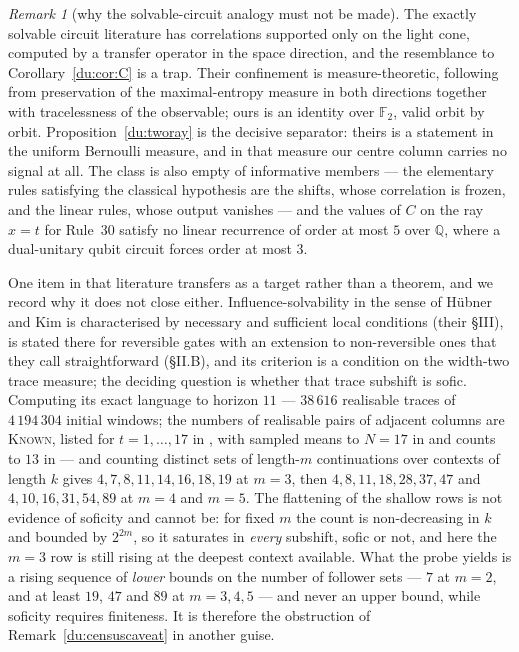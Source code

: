 \documentclass[11pt]{article}
\theoremstyle{definition}
\theoremstyle{remark}
\newtheorem{remark}[theorem]{Remark}
\newcommand{\F}{\mathbb{F}_2}
\newcommand{\Q}{\mathbb{Q}}
\newcommand{\KNOWN}{\textsc{Known}}
\begin{document}
\begin{remark}[why the solvable-circuit analogy must not be made]\label{du:nodual}
The exactly solvable circuit literature has correlations supported only on the light cone, computed by
a transfer operator in the space direction, and the resemblance to Corollary~\ref{du:cor:C} is a trap.
Their confinement is measure-theoretic, following from preservation of the maximal-entropy measure in
both directions together with tracelessness of the observable; ours is an identity over $\F$, valid
orbit by orbit. Proposition~\ref{du:tworay} is the decisive separator: theirs is a statement in the
uniform Bernoulli measure, and in that measure our centre column carries no signal at all. The class is
also empty of informative members --- the elementary rules satisfying the classical hypothesis are the
shifts, whose correlation is frozen, and the linear rules, whose output vanishes --- and the values of
$C$ on the ray $x=t$ for Rule~30 satisfy no linear recurrence of order at most $5$ over $\Q$, where a
dual-unitary qubit circuit forces order at most $3$.

One item in that literature transfers as a target rather than a theorem, and we record why it does not
close either. Influence-solvability in the sense of H\"ubner and Kim \cite{HubnerKim} is characterised by necessary
and sufficient local conditions (their \S III), is stated there for reversible gates with an extension to non-reversible
ones that they call straightforward (\S II.B), and its criterion is a condition on the width-two trace measure; the
deciding question is whether that trace subshift is sofic. Computing its exact language to horizon $11$
--- $38\,616$ realisable traces of $4\,194\,304$ initial windows; the numbers of realisable pairs of adjacent columns are \KNOWN, listed for $t=1,\dots,17$ in \cite[p.~1087]{NKS}, with sampled means to $N=17$ in \cite[Table~1]{MS} and counts to $13$ in \cite{Dib} --- and counting distinct sets of
length-$m$ continuations over contexts of length $k$ gives $4,7,8,11,14,16,18,19$ at $m=3$, then
$4,8,11,18,28,37,47$ and $4,10,16,31,54,89$ at $m=4$ and $m=5$. The flattening of the shallow rows is
not evidence of soficity and cannot be: for fixed $m$ the count is non-decreasing in $k$ and bounded by
$2^{2m}$, so it saturates in \emph{every} subshift, sofic or not, and here the $m=3$ row is still rising
at the deepest context available. What the probe yields is a rising sequence of \emph{lower} bounds on
the number of follower sets --- $7$ at $m=2$, and at least $19$, $47$ and $89$ at $m=3,4,5$ --- and
never an upper bound, while soficity requires finiteness. It is therefore the obstruction of
Remark~\ref{du:censuscaveat} in another guise.
\end{remark}
\end{document}

